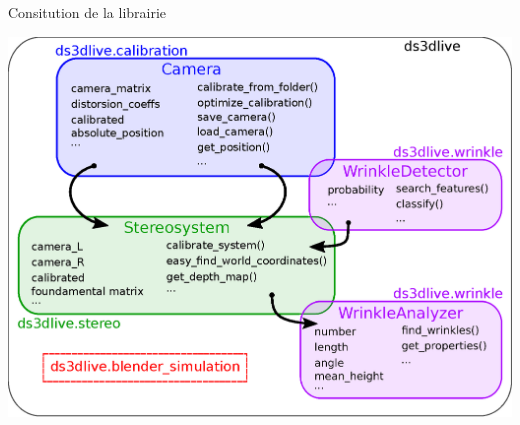 \documentclass[8pt]{beamer}
\begin{document}
	\begin{frame}{Consitution de la librairie}
		\begin{center}
			\includegraphics[width=.8\linewidth]{logigramme.eps}
		\end{center}
	\end{frame}
\end{document}
